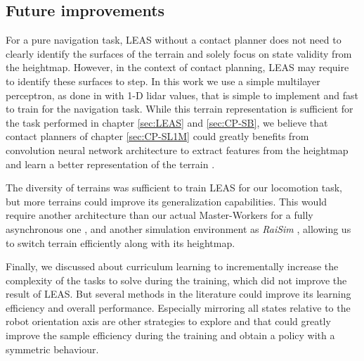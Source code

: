 \subsection{Future improvements}

For a pure navigation task, LEAS without a contact planner does not need to clearly identify the surfaces of the terrain and solely focus on state validity from the heightmap. 
However, in the context of contact planning, LEAS may require to identify these surfaces to step.
In this work we use a simple multilayer perceptron, as done in \cite{RL_RRT, RL_RRT_AUTORL} with 1-D lidar values, that is simple to implement and fast to train for the navigation task. 
While this terrain representation is sufficient for the task performed in chapter \ref{sec:LEAS} and \ref{sec:CP-SB}, we believe that contact planners of chapter \ref{sec:CP-SL1M} could greatly benefits from convolution neural network architecture to extract features from the heightmap and learn a better representation of the terrain \cite{deepLoco,deepGait,RLOC}.

The diversity of terrains was sufficient to train LEAS for our locomotion task, but more terrains could improve its generalization capabilities. This would require another architecture than our actual Master-Workers for a fully asynchronous one \cite{impala2018, DD_PPO}, and another simulation environment as \textit{RaiSim} \cite{raisim}, allowing us to switch terrain efficiently along with its heightmap.

Finally, we discussed about curriculum learning \cite{curriculum_learning_survey} to incrementally increase the complexity of the tasks to solve during the training, which did not improve the result of LEAS. But several methods in the literature could improve its learning efficiency and overall performance.
Especially mirroring all states relative to the robot orientation axis are other strategies to explore and that could greatly improve the sample efficiency during the training and obtain a policy with a symmetric behaviour.


